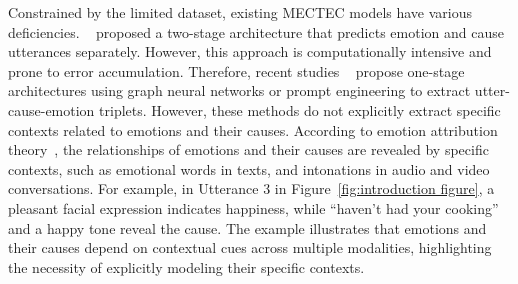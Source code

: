 \documentclass[11pt]{article}
\begin{document}
Constrained by the limited dataset,  existing MECTEC models have various deficiencies.
~\citet{ecf} proposed a two-stage architecture that predicts emotion and cause utterances separately.
However, this approach is computationally intensive and prone to error accumulation.
Therefore, recent studies ~\cite{UniMEEC, wang2023generative, li2024multimodal} propose one-stage architectures using graph neural networks or prompt engineering to extract utter-cause-emotion triplets.
However, these methods do not explicitly extract specific contexts related to emotions and their causes.
According to emotion attribution theory~\cite{weiner1985attributional}, the relationships of emotions and their causes are revealed by specific contexts, such as emotional words in texts, and intonations in audio and video conversations.
For example, in Utterance 3 in Figure~\ref{fig:introduction figure},  a pleasant facial expression indicates happiness, while “haven't had your cooking” and a happy tone reveal the cause.
The example illustrates that emotions and their causes depend on contextual cues across multiple modalities, highlighting the necessity of explicitly modeling their specific contexts.
\end{document}
